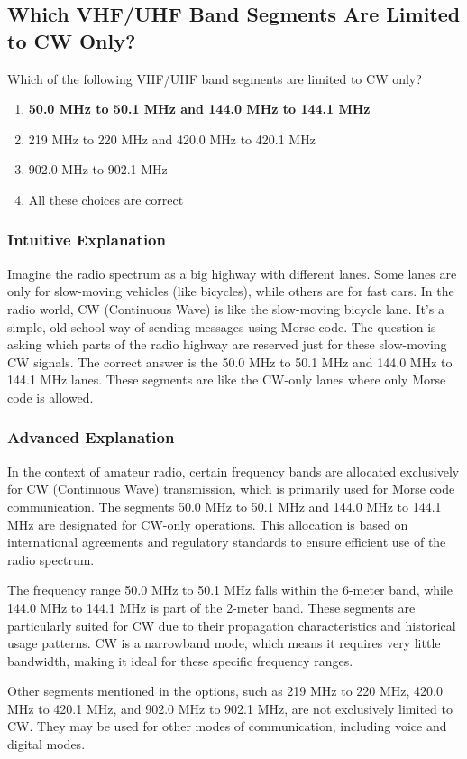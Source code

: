 \subsection{Which VHF/UHF Band Segments Are Limited to CW Only?}
\label{T1B07}

\begin{tcolorbox}[colback=gray!10!white,colframe=black!75!black,title=T1B07]
Which of the following VHF/UHF band segments are limited to CW only?
\begin{enumerate}[label=\Alph*)]
    \item \textbf{50.0 MHz to 50.1 MHz and 144.0 MHz to 144.1 MHz}
    \item 219 MHz to 220 MHz and 420.0 MHz to 420.1 MHz
    \item 902.0 MHz to 902.1 MHz
    \item All these choices are correct
\end{enumerate}
\end{tcolorbox}

\subsubsection{Intuitive Explanation}
Imagine the radio spectrum as a big highway with different lanes. Some lanes are only for slow-moving vehicles (like bicycles), while others are for fast cars. In the radio world, CW (Continuous Wave) is like the slow-moving bicycle lane. It’s a simple, old-school way of sending messages using Morse code. The question is asking which parts of the radio highway are reserved just for these slow-moving CW signals. The correct answer is the 50.0 MHz to 50.1 MHz and 144.0 MHz to 144.1 MHz lanes. These segments are like the CW-only lanes where only Morse code is allowed.

\subsubsection{Advanced Explanation}
In the context of amateur radio, certain frequency bands are allocated exclusively for CW (Continuous Wave) transmission, which is primarily used for Morse code communication. The segments 50.0 MHz to 50.1 MHz and 144.0 MHz to 144.1 MHz are designated for CW-only operations. This allocation is based on international agreements and regulatory standards to ensure efficient use of the radio spectrum.

The frequency range 50.0 MHz to 50.1 MHz falls within the 6-meter band, while 144.0 MHz to 144.1 MHz is part of the 2-meter band. These segments are particularly suited for CW due to their propagation characteristics and historical usage patterns. CW is a narrowband mode, which means it requires very little bandwidth, making it ideal for these specific frequency ranges.

Other segments mentioned in the options, such as 219 MHz to 220 MHz, 420.0 MHz to 420.1 MHz, and 902.0 MHz to 902.1 MHz, are not exclusively limited to CW. They may be used for other modes of communication, including voice and digital modes.

